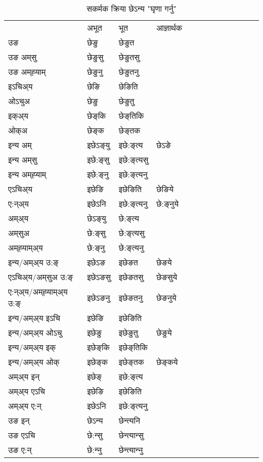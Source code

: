\begin{table}[H]
\centering
\caption{\label{eŋ.vt} सकर्मक क्रिया  छेऽन्य  "घृणा गर्नु"  }
\begin{tabular}{l|l|l|l|l|l|l|l|l|l|l|l|l}  \toprule
&अभूत & भूत & आज्ञार्थक \\ 
उङ &छेङु &छेङुत \\ 
उङ अम्‌सु &छेङुसु &छेङुतसु \\ 
उङ अम्‌ह्‍याम् &छेङुनु &छेङुतनु \\ 
इऽचिअ्य &छेङि &छेङिति   \\ 
ओऽचुअ &छेङु &छेङुतु   \\ 
इक्अ्य &छेङ्‌कि &छेङ्‌तिकि   \\ 
ओक्अ &छेङ्‌क &छेङ्‌तक   \\ 
इन्य अम् & इछेऽङ्‌यु  & इछे:ङ्‌त्य &छेऽङे  \\ 
इन्य अम्‌सु & इछे:ङ्‌सु  & इछे:ङ्‌त्यसु   \\ 
इन्य अम्‌ह्‍याम् & इछे:ङ्‌नु  & इछे:ङ्‌त्यनु   \\ 
एऽचिअ्य & इछेङि & इछेङिति &छेङिये    \\ 
ए:न्अ्य & इछेऽनि  & इछे:ङ्‌त्यनु &छे:ङ्‌नुये  \\ 
अम्अ्य & छेऽङ्‌यु  & छे:ङ्‌त्य  \\ 
अम्‌सुअ & छे:ङ्‌सु & छे:ङ्‌त्यसु  \\ 
अम्‌ह्‍याम्अ्य & छे:ङ्‌नु  & छे:ङ्‌त्यनु \\ 
\midrule
इन्य/अम्अ्य उ:ङ्‌&इछेऽङ & इछेङत &छेङये \\ 
एऽचिअ्य/अम्‌सुअ उ:ङ्‌ &इछेऽङसु & इछेङतसु &छेङसुये \\ 
ए:न्अ्य/अम्‌ह्‍याम्अ्य उ:ङ्‌ &इछेऽङनु & इछेङतनु &छेङनुये \\ 
इन्य/अम्अ्य इऽचि & इछेङि & इछेङिति    \\ 
इन्य/अम्अ्य ओऽचु & इछेङु & इछेङुतु  &छेङुये  \\ 
इन्य/अम्अ्य इक् & इछेङ्‌कि & इछेङ्‌तिकि   \\ 
इन्य/अम्अ्य ओक् & इछेङ्‌क & इछेङ्‌तक  &छेङ्‌कये  \\ 
अम्अ्य इन् & इछेङ्‌ & इछे:ङ्‌त्य   \\ 
अम्अ्य एऽचि & इछेङि & इछेङिति    \\ 
अम्अ्य ए:न् & इछेऽनि  & इछे:ङ्‌त्यनु  \\ 
\midrule
उङ इन् & छेऽन्य  & छेन्त्यनि  \\ 
उङ एऽचि & छे:न्सु  & छेन्त्यान्सु   \\ 
उङ ए:न्& छे:न्‍नु  & छेन्त्यान्‍नु   \\ 
\bottomrule
\end{tabular}
\end{table}


